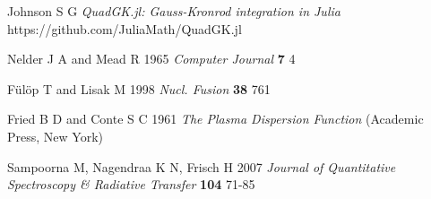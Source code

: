 \documentclass[12pt]{iopart}
\begin{document}
\begin{thebibliography}{9}
Johnson S G \textit{QuadGK.jl: Gauss-Kronrod integration in Julia} https://github.com/JuliaMath/QuadGK.jl

Nelder J A and Mead R 1965 \textit{Computer Journal} \textbf{7} 4

F{\"u}l{\"o}p T and Lisak M 1998 \textit{Nucl. Fusion} \textbf{38} 761

Fried B D and Conte S C 1961 \textit{The Plasma Dispersion Function} (Academic Press, New York)

Sampoorna M, Nagendraa K N, Frisch H 2007 \textit{Journal of Quantitative Spectroscopy \& Radiative Transfer} \textbf{104} 71-85


\end{thebibliography}
\end{document}
